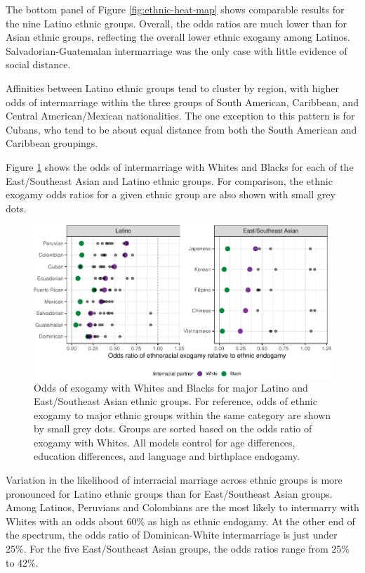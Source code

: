 \documentclass[11pt,]{article}
\begin{document}
The bottom panel of Figure \ref{fig:ethnic-heat-map} shows comparable results for the nine Latino ethnic groups. Overall, the odds ratios are much lower than for Asian ethnic groups, reflecting the overall lower ethnic exogamy among Latinos. Salvadorian-Guatemalan intermarriage was the only case with little evidence of social distance.

Affinities between Latino ethnic groups tend to cluster by region, with higher odds of intermarriage within the three groups of South American, Caribbean, and Central American/Mexican nationalities. The one exception to this pattern is for Cubans, who tend to be about equal distance from both the South American and Caribbean groupings.

Figure \ref{fig:racial-exogamy} shows the odds of intermarriage with Whites and Blacks for each of the East/Southeast Asian and Latino ethnic groups. For comparison, the ethnic exogamy odds ratios for a given ethnic group are also shown with small grey dots.

\begin{figure}
\centering
\includegraphics{main_files/figure-latex/racial-exogamy-1.pdf}
\caption{\label{fig:racial-exogamy}Odds of exogamy with Whites and Blacks for major Latino and East/Southeast Asian ethnic groups. For reference, odds of ethnic exogamy to major ethnic groups within the same category are shown by small grey dots. Groups are sorted based on the odds ratio of exogamy with Whites. All models control for age differences, education differences, and language and birthplace endogamy.}
\end{figure}

Variation in the likelihood of interracial marriage across ethnic groups is more pronounced for Latino ethnic groups than for East/Southeast Asian groups. Among Latinos, Peruvians and Colombians are the most likely to intermarry with Whites with an odds about 60\% as high as ethnic endogamy. At the other end of the spectrum, the odds ratio of Dominican-White intermarriage is just under 25\%. For the five East/Southeast Asian groups, the odds ratios range from 25\% to 42\%.
\end{document}
